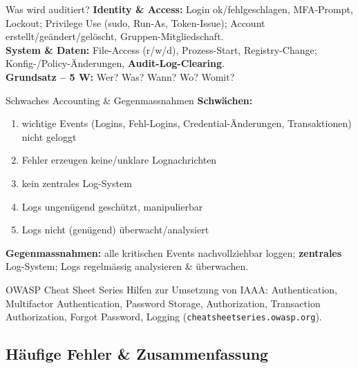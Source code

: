 \documentclass[a4paper, fontsize=7pt]{scrartcl}
\begin{document}
\begin{subbox}{Was wird auditiert?}
\textbf{Identity \& Access:} Login ok/fehlgeschlagen, MFA-Prompt, Lockout;
Privilege Use (sudo, Run-As, Token-Issue); Account erstellt/geändert/gelöscht,
Gruppen-Mitgliedschaft.\\
\textbf{System \& Daten:} File-Access (r/w/d), Prozess-Start,
Registry-Change; Konfig-/Policy-Änderungen, \textbf{Audit-Log-Clearing}.\\
\textbf{Grundsatz -- 5 W:} Wer? Was? Wann? Wo? Womit?
\end{subbox}

\begin{mainbox}{Schwaches Accounting \& Gegenmassnahmen}
\textbf{Schwächen:}
\begin{enumerate}
    \item wichtige Events (Logins, Fehl-Logins, Credential-Änderungen,
          Transaktionen) nicht geloggt
    \item Fehler erzeugen keine/unklare Lognachrichten
    \item kein zentrales Log-System
    \item Logs ungenügend geschützt, manipulierbar
    \item Logs nicht (genügend) überwacht/analysiert
\end{enumerate}
\textbf{Gegenmassnahmen:} alle kritischen Events nachvollziehbar loggen;
\textbf{zentrales} Log-System; Logs regelmässig analysieren \& überwachen.
\end{mainbox}

\begin{subbox}{OWASP Cheat Sheet Series}
Hilfen zur Umsetzung von IAAA: Authentication, Multifactor Authentication,
Password Storage, Authorization, Transaction Authorization, Forgot Password,
Logging (\texttt{cheatsheetseries.owasp.org}).
\end{subbox}

\subsection{Häufige Fehler \& Zusammenfassung}
\end{document}
